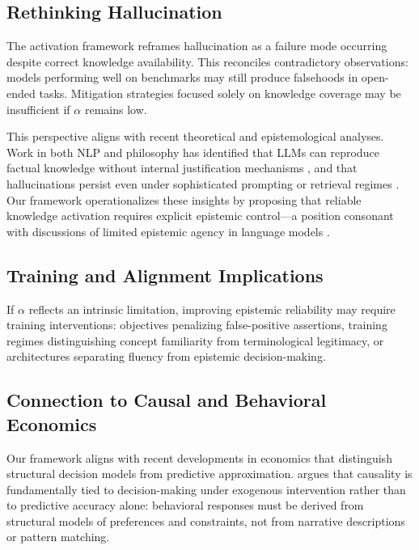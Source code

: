 \documentclass[11pt,a4paper]{article}
\begin{document}
\subsection{Rethinking Hallucination}

The activation framework reframes hallucination as a failure mode occurring despite correct knowledge availability. This reconciles contradictory observations: models performing well on benchmarks may still produce falsehoods in open-ended tasks. Mitigation strategies focused solely on knowledge coverage may be insufficient if $\alpha$ remains low.

This perspective aligns with recent theoretical and epistemological analyses. Work in both NLP and philosophy has identified that LLMs can reproduce factual knowledge without internal justification mechanisms \citep{hila2025epistemological}, and that hallucinations persist even under sophisticated prompting or retrieval regimes \citep{gumaan2025theoretical}. Our framework operationalizes these insights by proposing that reliable knowledge activation requires explicit epistemic control---a position consonant with discussions of limited epistemic agency in language models \citep{li2025reflection}.

\subsection{Training and Alignment Implications}

If $\alpha$ reflects an intrinsic limitation, improving epistemic reliability may require training interventions: objectives penalizing false-positive assertions, training regimes distinguishing concept familiarity from terminological legitimacy, or architectures separating fluency from epistemic decision-making.

\subsection{Connection to Causal and Behavioral Economics}

Our framework aligns with recent developments in economics that distinguish structural decision models from predictive approximation. \citet{kasy2026causality} argues that causality is fundamentally tied to decision-making under exogenous intervention rather than to predictive accuracy alone: behavioral responses must be derived from structural models of preferences and constraints, not from narrative descriptions or pattern matching.
\end{document}
